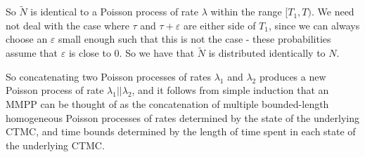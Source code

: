 So $\widetilde{N}$ is identical to a Poisson process of rate $\lambda$ within the range $[T_1,T)$. We need not deal with the case where $\tau$ and $\tau+\varepsilon$ are either side of $T_1$, since we can always choose an $\varepsilon$ small enough such that this is not the case - these probabilities assume that $\varepsilon$ is close to 0. So we have that $\widetilde{N}$ is distributed identically to $N$.

So concatenating two Poisson processes of rates $\lambda_1$ and $\lambda_2$ produces a new Poisson process of rate $\lambda_1||\lambda_2$, and it follows from simple induction that an MMPP can be thought of as the concatenation of multiple bounded-length homogeneous Poisson processes of rates determined by the state of the underlying CTMC, and time bounds determined by the length of time spent in each state of the underlying CTMC.
